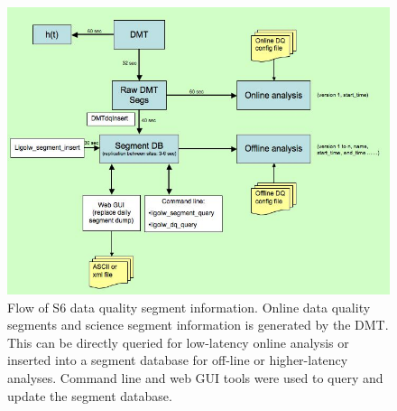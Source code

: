 \begin{figure}[h]
  \label{f:segment_flow}
  \includegraphics[width=\linewidth]{figures/segdb/T0900005_fig1}
  \caption[Flow of S6 data quality information]{
  Flow of S6 data quality segment information. Online data
  quality segments and science segment information is generated by the DMT.
  This can be directly queried for low-latency online analysis or inserted
  into a segment database for off-line or higher-latency analyses. Command
  line and web GUI tools were used to query and update the segment
  database.} 
\end{figure}

